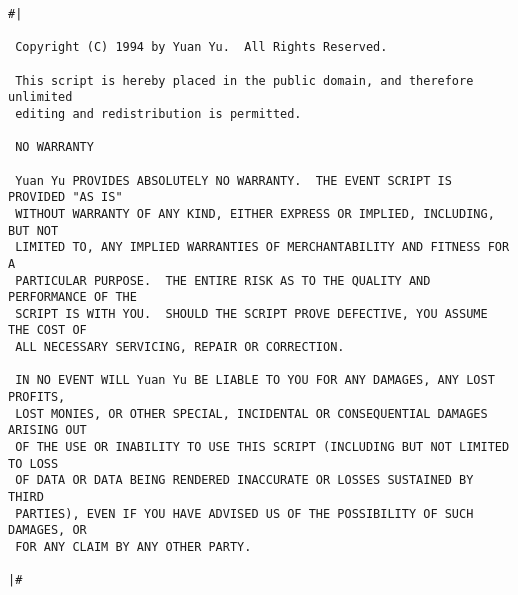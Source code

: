 \makeindex


\begin{verbatim}#|

 Copyright (C) 1994 by Yuan Yu.  All Rights Reserved.

 This script is hereby placed in the public domain, and therefore unlimited
 editing and redistribution is permitted.

 NO WARRANTY

 Yuan Yu PROVIDES ABSOLUTELY NO WARRANTY.  THE EVENT SCRIPT IS PROVIDED "AS IS"
 WITHOUT WARRANTY OF ANY KIND, EITHER EXPRESS OR IMPLIED, INCLUDING, BUT NOT
 LIMITED TO, ANY IMPLIED WARRANTIES OF MERCHANTABILITY AND FITNESS FOR A
 PARTICULAR PURPOSE.  THE ENTIRE RISK AS TO THE QUALITY AND PERFORMANCE OF THE
 SCRIPT IS WITH YOU.  SHOULD THE SCRIPT PROVE DEFECTIVE, YOU ASSUME THE COST OF
 ALL NECESSARY SERVICING, REPAIR OR CORRECTION.

 IN NO EVENT WILL Yuan Yu BE LIABLE TO YOU FOR ANY DAMAGES, ANY LOST PROFITS,
 LOST MONIES, OR OTHER SPECIAL, INCIDENTAL OR CONSEQUENTIAL DAMAGES ARISING OUT
 OF THE USE OR INABILITY TO USE THIS SCRIPT (INCLUDING BUT NOT LIMITED TO LOSS
 OF DATA OR DATA BEING RENDERED INACCURATE OR LOSSES SUSTAINED BY THIRD
 PARTIES), EVEN IF YOU HAVE ADVISED US OF THE POSSIBILITY OF SUCH DAMAGES, OR
 FOR ANY CLAIM BY ANY OTHER PARTY.

|#

\end{verbatim}
%
\newpage
{}
\thispagestyle{empty}
